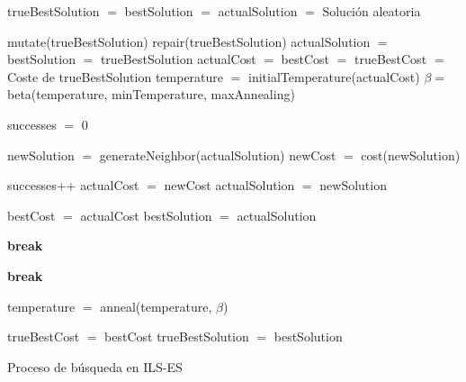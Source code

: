 \begin{algorithm}[H]
    \SetAlgoLined
        trueBestSolution $=$ bestSolution $=$ actualSolution $=$ Solución aleatoria \;
        \BlankLine \BlankLine
         {
            mutate(trueBestSolution) \;
            repair(trueBestSolution) \;
            \BlankLine \BlankLine
            actualSolution $=$ bestSolution $=$ trueBestSolution\;
            actualCost $=$ bestCost $=$ trueBestCost $=$ Coste de trueBestSolution\;
            \BlankLine \BlankLine
            temperature $=$ initialTemperature(actualCost) \;
            $\beta =$ beta(temperature, minTemperature, maxAnnealing) \;
            \BlankLine \BlankLine
             {
                successes $=$ $0$ \;
                 {
                    newSolution $=$ generateNeighbor(actualSolution) \;
                    newCost $=$ cost(newSolution) \;
                    \BlankLine \BlankLine
                     {
                        successes++ \;
                        actualCost $=$ newCost \;
                        actualSolution $=$ newSolution \;

                         {
                            bestCost $=$ actualCost \;
                            bestSolution $=$ actualSolution \;
                        }
                    }

                     {
                        \textbf{break} \;
                    }
                }
                 {
                    \textbf{break} \;
                }

                temperature $=$ anneal(temperature, $\beta$) \;
            }
            \BlankLine \BlankLine
             {
                trueBestCost $=$ bestCost \;
                trueBestSolution $=$ bestSolution \;
            }
        }
    \caption{Proceso de búsqueda en ILS-ES}
\end{algorithm}